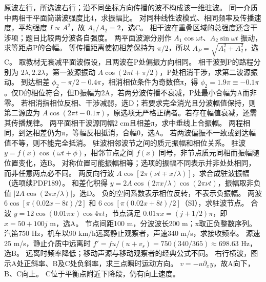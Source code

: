\crosscheck 原波左行，所选波右行；沿不同坐标方向传播的波不构成该一维驻波。
\problemtext 同一介质中两相干平面简谐波强度比4，求振幅比。
\workings 对同种线性波模式、相同频率及传播速度，平均强度 $I\propto A^2$，故 $A_1/A_2=2$，选C。
\crosscheck 相干波在重叠区域的总强度还含干涉项；题目比较两分波各自强度。
\problemtext 两平面波源分别作 $A_1\cos\omega t$、$A_2\sin\omega t$ 振动，求等距点P的合幅。
\workings 等传播距离使初相差保持为 $\pi/2$，所以 $A_P=\sqrt{A_1^2+A_2^2}$，选C。
\crosscheck 取教材无衰减平面波假设，且两波在P处偏振方向相同。
\problemtext 相干波到P的路程分别为 $2\lambda,2.2\lambda$，第一波源振动 $A\cos(2\pi t+\pi/2)$，P处相消干涉，求第二波源振动。
\workings 到达相差 $\phi_2-\pi/2-0.4\pi$，相消相位条件为奇数倍π，得 $\phi_2=1.9\pi\equiv-0.1\pi$。仅D的相位符合，但D振幅为2A，若两分波传播不衰减，P处最小合幅为A而非零。
\crosscheck 若相消指相位反相、干涉减弱，选D；若要求完全消光且分波幅值保持，则第二源应为 $A\cos(2\pi t-0.1\pi)$，原选项无严格正确者。若存在幅值衰减，还需其传播规律。
\problemtext 两平面相干波源同幅2 cm且相差π，求中垂线上合振幅。
\workings 两程相同，到达相差仍为π，等幅反相抵消，合幅0，选A。
\crosscheck 若两波偏振不一致或到达幅值不等，则不能完全抵消。
\problemtext 驻波相邻波节之间的质元振幅和相位关系。
\workings 驻波 $y=f(x)\cos(\omega t+\phi)$，相邻节点之间 $f(x)$ 同号，非节点质元同相而振幅随位置变化，选B。
\crosscheck 对称位置可能振幅相等；选项的振幅不同表示并非处处相同，而非任意两点必不同。
\problemtext 两反向行波 $A\cos[2\pi(\nu t\mp x/\lambda)]$，求合成驻波振幅（选项续PDF189）。
\workings 和差化积得 $y=2A\cos(2\pi x/\lambda)\cos(2\pi\nu t)$，振幅取非负值 $|2A\cos(2\pi x/\lambda)|$，选D。
\crosscheck 负的空间系数表示相位反转，不表示负振幅。
\problemtext 两波 $6\cos[\pi(0.02x-8t)/2]$ 和 $6\cos[\pi(0.02x+8t)/2]$（SI），求驻波节点。
\workings 合波 $y=12\cos(0.01\pi x)\cos4\pi t$，节点满足 $0.01\pi x=(j+1/2)\pi$，即 $x=50+100j$ m，选A。
\crosscheck 节点间距100 m，分波波长200 m；x取正负整数序列。
\problemtext 汽笛750 Hz，机车以90 km/h远离静止观察者，声速340 m/s，求接收频率。
\workings 源速25 m/s，静止介质中远离时 $f'=f u/(u+v_s)=750(340/365)\approx698.63$ Hz，选B。
\crosscheck 远离时频率降低；移动声源与移动观察者的经典公式不同。
\problemtext 右行横波，图示A处正斜率、B及C处负斜率，求三点瞬时运动方向。
\workings $v=-u\partial_x y$，故A向下，B、C向上。
\crosscheck C位于平衡点附近下降段，仍有向上速度。
